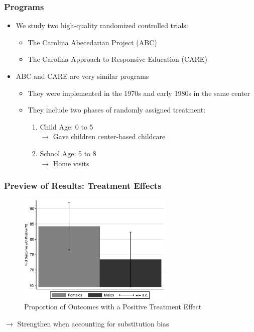 \documentclass[static]{JJH-Beamer}
\begin{document}
\begin{frame}
\frametitle{Programs} \label{programs}
\begin{itemize}
	\item We study two high-quality randomized controlled trials:
	\begin{itemize}
		\item The Carolina Abecedarian Project (ABC) 
		\item The Carolina Approach to Responsive Education (CARE)
	\end{itemize}
	\item ABC and CARE are very similar programs
	\begin{itemize}
		\item They were implemented in the 1970s and early 1980s in the same center
		\item They include two phases of randomly assigned treatment:
			\begin{enumerate}
				\item Child Age: 0 to 5 \\ 
					$\rightarrow$ Gave children center-based childcare \\
				\item School Age: 5 to 8 \\ 
				$\rightarrow$ Home visits				
			\end{enumerate}
	\end{itemize}
\end{itemize}
\hyperlink{secondphase}{}
\end{frame}


\begin{frame}
\frametitle{Preview of Results: Treatment Effects}
\begin{figure}
\caption{Proportion of Outcomes with a Positive Treatment Effect}
	\includegraphics[width=20em]{output/itt_noctrl_all.eps}
\end{figure}
$\rightarrow$ Strengthen when accounting for substitution bias
\end{frame}
\end{document}
